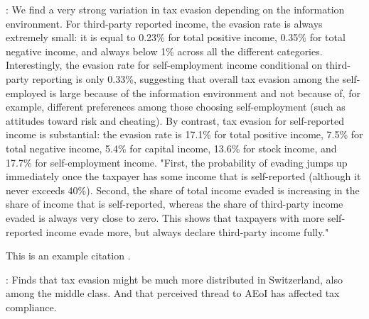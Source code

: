 \documentclass[12pt]{article}
\begin{document}
\cite{kleven2011unwilling}: We find a very strong variation in tax evasion depending on the information environment. For third-party reported income, the evasion rate is always extremely small: it is equal to 0.23\% for total positive income, 0.35\% for total negative income, and always below 1\% across all the different categories. Interestingly, the evasion rate for self-employment income conditional on third-party reporting is only 0.33\%, suggesting that overall tax evasion among the self-employed is large because of the information environment and not because of, for example, different preferences among those choosing self-employment (such as attitudes toward risk and cheating). By contrast, tax evasion for self-reported income is substantial: the evasion rate is 17.1\% for total positive income, 7.5\% for total negative income, 5.4\% for capital income, 13.6\% for stock income, and 17.7\% for self-employment income.
"First, the probability of evading jumps up immediately once the taxpayer has some income that is self-reported (although it never exceeds 40\%). Second, the share of total income evaded is increasing in the share of income that is self-reported, whereas the share of third-party income evaded is always very close to zero. This shows that taxpayers with more self-reported income evade more, but always declare third-party income fully."


This is an example citation \cite{boning2025welfare}.

\cite{baselgia2023compliance}: Finds that tax evasion might be much more distributed in Switzerland, also among the middle class. And that perceived thread to AEoI has affected tax compliance. 




\printbibliography[heading=bibintoc]
\end{document}
